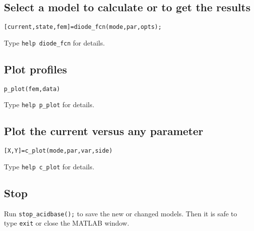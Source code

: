 \documentclass[12pt,a4paper]{article}
\begin{document}
\subsection{Select a model to calculate or to get the results}
\verb|[current,state,fem]=diode_fcn(mode,par,opts);|

Type \verb|help diode_fcn| for details.

\subsection{Plot profiles}
\verb|p_plot(fem,data)|

Type \verb|help p_plot| for details.

\subsection{Plot the current versus any parameter}
\verb|[X,Y]=c_plot(mode,par,var,side)|

Type \verb|help c_plot| for details.

\subsection{Stop}
Run \verb|stop_acidbase();| to save the new or changed models.
Then it is safe to type \verb|exit| or close the MATLAB window.
\end{document}
